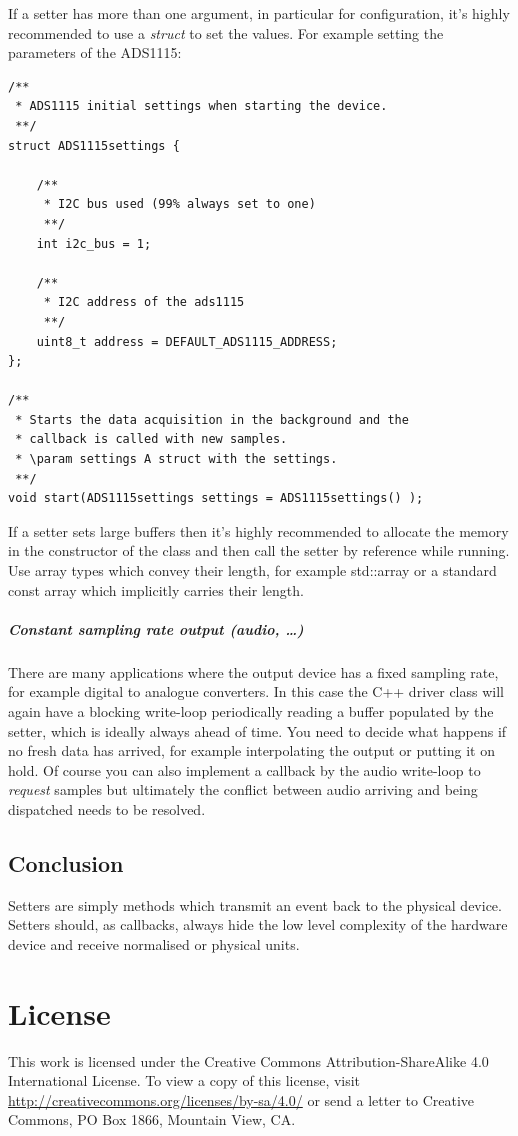 \documentclass[12pt]{report}
\begin{document}
If a setter has more than one argument, in particular for
configuration, it's highly recommended to use a \textsl{struct} to set
the values. For example setting the parameters of the ADS1115:
\begin{verbatim}
/**
 * ADS1115 initial settings when starting the device.
 **/
struct ADS1115settings {

	/**
	 * I2C bus used (99% always set to one)
	 **/
	int i2c_bus = 1;

	/**
	 * I2C address of the ads1115
	 **/
	uint8_t address = DEFAULT_ADS1115_ADDRESS;
};

/**
 * Starts the data acquisition in the background and the
 * callback is called with new samples.
 * \param settings A struct with the settings.
 **/
void start(ADS1115settings settings = ADS1115settings() );
\end{verbatim}

If a setter sets large buffers then it's highly recommended
to allocate the memory in the constructor of the class and then call the setter by reference
while running. Use array types which convey their length, for example
std::array or a standard const array which implicitly carries their length.

\paragraph{Constant sampling rate output (audio, \ldots)}
There are many applications where the output device has a fixed
sampling rate, for example digital to analogue converters.  In this
case the C++ driver class will again have a blocking write-loop
periodically reading a buffer populated by the setter, which is
ideally always ahead of time.
You need to decide what happens if no
fresh data has arrived, for example interpolating the output or
putting it on hold. Of course you can also implement a callback by the
audio write-loop to \textsl{request} samples but ultimately
the conflict between audio arriving and being dispatched needs to be
resolved.

\section{Conclusion}
Setters are simply methods which transmit an event back to the physical
device. Setters should, as callbacks, always hide the low level
complexity of the hardware device and receive normalised or physical
units.


\clearpage
\appendix
\chapter{License}
This work is licensed under the Creative Commons
Attribution-ShareAlike 4.0 International License. To view a copy of
this license, visit
\url{http://creativecommons.org/licenses/by-sa/4.0/} or
send a letter to Creative Commons, PO Box 1866, Mountain View, CA.
\end{document}
